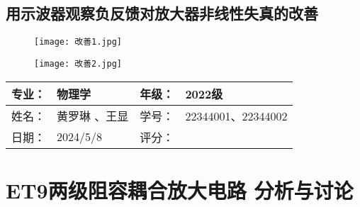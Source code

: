 \documentclass[dvipsnames, svgnames,a4paper,11pt]{article}
\begin{document}
				\subsection{用示波器观察负反馈对放大器非线性失真的改善}
				\begin{figure}[{H}]
		\centering
		\texttt{[image: 改善1.jpg]}
		\label{}
	\end{figure}
	\begin{figure}[{H}]
		\centering
		\texttt{[image: 改善2.jpg]}
		\label{}
	\end{figure}

\clearpage
	\begin{table}
		\renewcommand\arraystretch{1.7}
		\begin{tabularx}{\textwidth}{|X|X|X|X|}
			\hline
			专业：& 物理学 &年级：& 2022级\\
			\hline
			姓名： &黄罗琳 、王显 & 学号：&22344001、22344002 \\
			\hline
			日期：& 2024/5/8  & 评分： &\\
			\hline
		\end{tabularx}
	\end{table}
	
	\section{ET9两级阻容耦合放大电路 \quad\heiti 分析与讨论}
	

	
\end{document}
